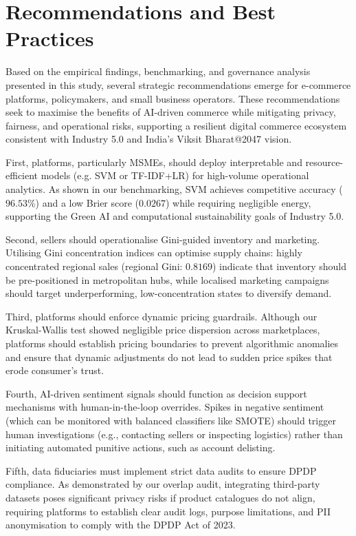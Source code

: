 \documentclass[authoryear,review,3p,times,12pt]{elsarticle}
\begin{document}
\section{Recommendations and Best Practices}
\label{sec:recommendations}
Based on the empirical findings, benchmarking, and governance analysis presented in this study, several strategic recommendations emerge for e-commerce platforms, policymakers, and small business operators. These recommendations seek to maximise the benefits of AI-driven commerce while mitigating privacy, fairness, and operational risks, supporting a resilient digital commerce ecosystem consistent with Industry 5.0 and India's Viksit Bharat@2047 vision.

First, platforms, particularly MSMEs, should deploy interpretable and resource-efficient models (e.g. SVM or TF-IDF+LR) for high-volume operational analytics. As shown in our benchmarking, SVM achieves competitive accuracy ($96.53\%$) and a low Brier score ($0.0267$) while requiring negligible energy, supporting the Green AI and computational sustainability goals of Industry 5.0.

Second, sellers should operationalise Gini-guided inventory and marketing. Utilising Gini concentration indices can optimise supply chains: highly concentrated regional sales (regional Gini: $0.8169$) indicate that inventory should be pre-positioned in metropolitan hubs, while localised marketing campaigns should target underperforming, low-concentration states to diversify demand.

Third, platforms should enforce dynamic pricing guardrails. Although our Kruskal-Wallis test showed negligible price dispersion across marketplaces, platforms should establish pricing boundaries to prevent algorithmic anomalies and ensure that dynamic adjustments do not lead to sudden price spikes that erode consumer’s trust.

Fourth, AI-driven sentiment signals should function as decision support mechanisms with human-in-the-loop overrides. Spikes in negative sentiment (which can be monitored with balanced classifiers like SMOTE) should trigger human investigations (e.g., contacting sellers or inspecting logistics) rather than initiating automated punitive actions, such as account delisting.

Fifth, data fiduciaries must implement strict data audits to ensure DPDP compliance. As demonstrated by our overlap audit, integrating third-party datasets poses significant privacy risks if product catalogues do not align, requiring platforms to establish clear audit logs, purpose limitations, and PII anonymisation to comply with the DPDP Act of 2023.
\end{document}
